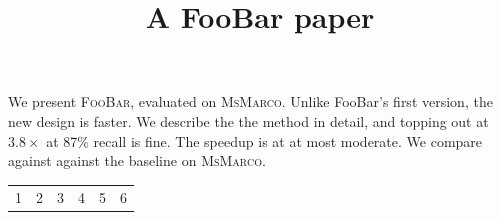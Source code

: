 \documentclass{article}
\newcommand{\sysname}{\textsc{FooBar}\xspace}
\newcommand{\data}{\textsc{MsMarco}\xspace}
\begin{document}
\title{A FooBar paper}
\maketitle
We present \sysname, evaluated on \data. Unlike FooBar's first version, the new
design is faster. We describe the the method in detail, and topping out at $3.8\times$ at
87\% recall is fine. The speedup is at \cite{x} at most moderate. We compare
against
against the baseline on \data.
\begin{tabular}{rrr rrr}
1 & 2 & 3 & 4 & 5 & 6
\end{tabular}
\end{document}
